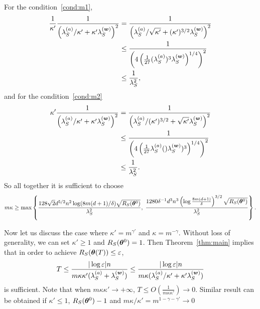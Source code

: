\documentclass{article}
\begin{document}
\begin{rmk}
    For the condition~\ref{cond:m1},
    \begin{equation}
        \begin{aligned}
            \frac{1}{\kappa'}\frac{1}{\left(\lambda_S^{(a)}/\kappa'+\kappa'\lambda_S^{(\bm{w})}\right)^2}
             & =\frac{1}{\left(\lambda_S^{(a)}/\sqrt{\kappa'}+(\kappa')^{3/2}\lambda_S^{(\bm{w})}\right)^2}          \\
             & \leq\frac{1}{\left(4\left(\frac{1}{27}(\lambda_S^{(a)})^3\lambda_S^{(\bm{w})}\right)^{1/4}\right) ^2} \\
             & \leq\frac{1}{\lambda_S^2},
        \end{aligned}
    \end{equation}
    and for the condition~\ref{cond:m2}
    \begin{equation}
        \begin{aligned}
            \kappa'\frac{1}{\left(\lambda_S^{(a)}/\kappa'+\kappa'\lambda_S^{(\bm{w})}\right)^2}
             & =\frac{1}{\left(\lambda_S^{(a)}/(\kappa')^{3/2}+\sqrt{\kappa'}\lambda_S^{(\bm{w})}\right)^2}           \\
             & \leq\frac{1}{\left(4\left(\frac{1}{27}\lambda_S^{(a)}()\lambda_S^{(\bm{w})})^3\right)^{1/4}\right) ^2} \\
             & \leq\frac{1}{\lambda_S^2}.
        \end{aligned}
    \end{equation}
    So all together it is sufficient to choose
    \begin{equation}
        m\kappa\geq\max\left\{\frac{128\sqrt{2}d^{5/2}n^2\log(8m(d+1)/\delta)\sqrt{R_S(\bm{\theta}^0)}}{\lambda_S^2},\;\frac{1280\delta^{-1}d^3n^3\left(\log\frac{8m(d+1)}{\delta}\right)^{3/2}\sqrt{R_S(\bm{\theta}^0)}}{\lambda_S^2}\right\}.
    \end{equation}
\end{rmk}

Now let us discuss the case where $\kappa'=m^{\gamma'}$ and $\kappa=m^{-\gamma}$. Without loss of generality, we can set $\kappa'\geq 1$ and $R_S(\bm{\theta}^0)=1$. Then Theorem~\ref{thm:main} implies that in order to achieve $R_S(\bm{\theta}(T))\leq\varepsilon$,
\begin{equation}
    T\leq\frac{|\log\varepsilon|n}{m\kappa\kappa'(\lambda_S^{(a)}+\lambda_S^{(\bm{w})})}\leq\frac{|\log\varepsilon|n}{m\kappa(\lambda_S^{(a)}/\kappa'+\kappa'\lambda_S^{(\bm{w})})}
\end{equation}
is sufficient. Note that when $m\kappa\kappa'\to+\infty$, $T\leq O(\frac{1}{m\kappa\kappa'})\to 0$. Similar result can be obtained if $\kappa'\leq 1$, $R_S(\bm{\theta}^0)-1$ and $m\kappa/\kappa'=m^{1-\gamma-\gamma'}\to 0$
\end{document}
